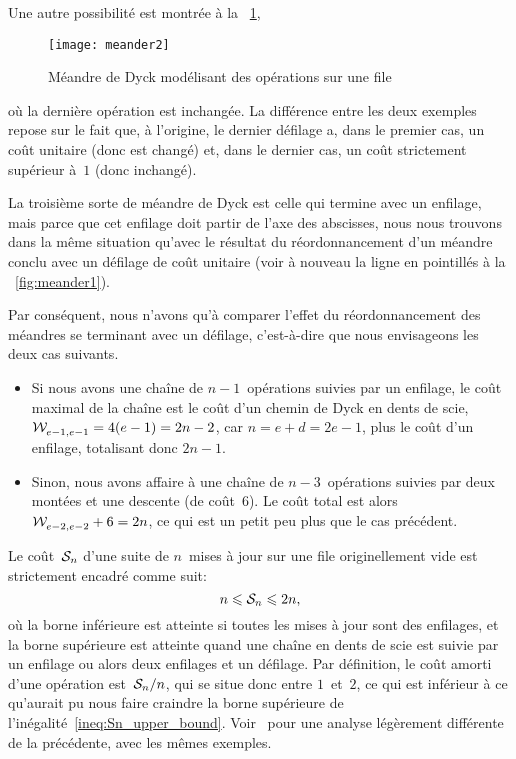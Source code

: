 Une autre possibilité est montrée à la \fig~\ref{fig:meander2},
\begin{figure}
\centering
\texttt{[image: meander2]}
\caption{Méandre de Dyck modélisant des opérations sur une file}
\label{fig:meander2}
\end{figure}
où la dernière opération est inchangée. La différence entre les deux
exemples repose sur le fait que, à l'origine, le dernier défilage a,
dans le premier cas, un coût unitaire (donc est changé) et, dans le
dernier cas, un coût strictement supérieur à~\(1\) (donc inchangé).

La troisième sorte de méandre de Dyck est celle qui termine avec un
enfilage, mais parce que cet enfilage doit partir de l'axe des
abscisses, nous nous trouvons dans la même situation qu'avec le
résultat du réordonnancement d'un méandre conclu avec un défilage de
coût unitaire (voir à nouveau la ligne en pointillés à la
\fig~\ref{fig:meander1}).

Par conséquent, nous n'avons qu'à comparer l'effet du réordonnancement
des méandres se terminant avec un défilage, c'est-à-dire que nous
envisageons les deux cas suivants.
\begin{itemize}

\item Si nous avons une chaîne de \(n-1\)~opérations suivies par un
  enfilage, le coût maximal de la chaîne est le coût d'un chemin de
  Dyck en dents de scie, \(\mathcal{W}_{e-1,e-1}^{}=4(e-1)=2n-2\), car
  \(n=e+d=2e-1\), plus le coût d'un enfilage, totalisant donc
  \(2n-1\).

  \item Sinon, nous avons affaire à une chaîne de \(n-3\)~opérations
  suivies par deux montées et une descente (de coût~\(6\)). Le coût
  total est alors \(\mathcal{W}_{e-2,e-2}^{}+6=2n\), ce qui est un petit peu plus
  que le cas précédent.

\end{itemize}


Le coût~\(\mathcal{S}_{n}\) d'une suite de \(n\)~mises à jour sur une file
originellement vide est strictement encadré comme
suit:
\begin{equation*}
n \leqslant \mathcal{S}_{n} \leqslant 2n,
\end{equation*}
où la borne inférieure est atteinte si toutes les mises à jour sont
des enfilages, et la borne supérieure est atteinte quand une chaîne en
dents de scie est suivie par un enfilage ou alors deux enfilages et un
défilage. Par définition, le coût amorti d'une opération
est~\(\mathcal{S}_{n}/n\), qui se situe donc entre \(1\)~et~\(2\), ce qui est
inférieur à ce qu'aurait pu nous faire craindre la borne supérieure de
l'inégalité~\eqref{ineq:Sn_upper_bound}. Voir~\citep{Rinderknecht_2011}
pour une analyse légèrement différente de la précédente, avec les
mêmes exemples.


